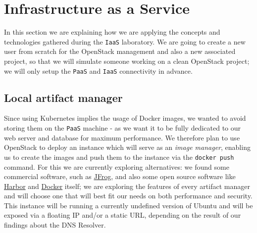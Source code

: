 \section{Infrastructure as a Service}
\label{cha:iaas}
In this section we are explaining how we are applying the concepts and technologies gathered during the \verb=IaaS= laboratory.
\newline
We are going to create a new user from scratch for the OpenStack management and also a new associated project, so that we will simulate someone working on a clean OpenStack project; we will only setup the \verb=PaaS= and \verb=IaaS= connectivity in advance.

\subsection{Local artifact manager}
Since using Kubernetes implies the usage of Docker images, we wanted to avoid storing them on the \verb=PaaS= machine - as we want it to be fully dedicated to our web server and database for maximum performance. %
\newline
We therefore plan to use OpenStack to deploy an instance which will serve as an \textit{image manager}, enabling us to create the images and push them to the instance via the \texttt{docker push} command. %
\newline
For this we are currently exploring alternatives: we found some commercial software, such as \href{https://jfrog.com/artifactory/?utm_source=google&utm_medium=cpc&utm_campaign=11007065731&gclid=Cj0KCQjw-LOEBhDCARIsABrC0TnZ212Fk7c3MtotiYg5Zj9HIu-aWW_Ih3kIkz_2Fak0bys6JJxq5_MaAtDNEALw_wcB}{JFrog}, and also some open source software like \href{https://goharbor.io/}{Harbor} and \href{https://docs.docker.com/registry/}{Docker} itself; we are exploring the features of every artifact manager and will choose one that will best fit our needs on both performance and security.%
\newline
This instance will be running a currently undefined version of Ubuntu and will be exposed via a floating IP and/or a static URL, depending on the result of our findings about the DNS Resolver.


